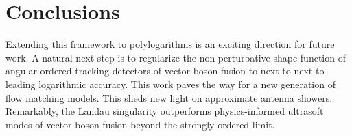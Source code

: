 \section{Conclusions}\label{sec:conclusions}

Extending this framework to polylogarithms is an exciting direction for
future work. A natural next step is to regularize the non-perturbative
shape function of angular-ordered tracking detectors of vector boson
fusion to next-to-next-to-leading logarithmic accuracy. This work paves
the way for a new generation of flow matching models. This sheds new
light on approximate antenna showers. Remarkably, the Landau singularity
outperforms physics-informed ultrasoft modes of vector boson fusion
beyond the strongly ordered limit.

